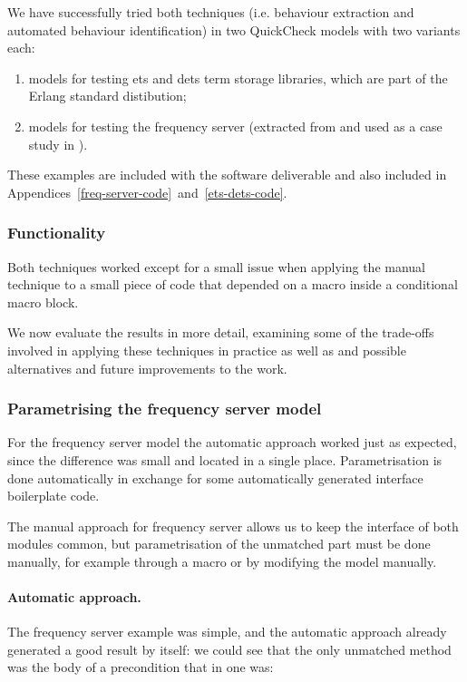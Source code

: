We have successfully tried both techniques  (i.e. behaviour extraction and 
automated behaviour identification) in two QuickCheck models with two variants 
each:

\begin{enumerate}
 \item models for testing ets and dets term storage libraries, which are part 
of 
the Erlang standard distibution;
 \item models for testing the frequency server (extracted from 
\cite{CesariniThompson} and used as a case study in \cite{ExtractingQC}).
\end{enumerate}
These examples are included with the software deliverable and also 
included in Appendices~\ref{freq-server-code}~and~\ref{ets-dets-code}.

\subsubsection{Functionality}

Both techniques worked except for a small issue when applying the manual 
technique to a small piece of code that 
depended on a macro inside a conditional macro block. 

We now evaluate the results in more detail, examining some of the trade-offs 
involved in applying these techniques in practice as well as and 
possible alternatives and future improvements to the work.

\subsubsection{Parametrising the frequency server model}

For the frequency server model the automatic approach worked just as expected, 
since the difference was small and located in a single place. Parametrisation 
is done automatically in exchange for some automatically generated interface 
boilerplate code.

The manual approach for frequency server allows us to keep the 
interface of both modules {\color{red}common}, but parametrisation of the 
unmatched part must be done manually, for example through a macro or by 
modifying the model manually.

\paragraph{Automatic approach.}

The frequency server example was simple, and the automatic approach 
already generated a good result by itself: we could see that the only 
unmatched method was the body of a precondition that in one was:


